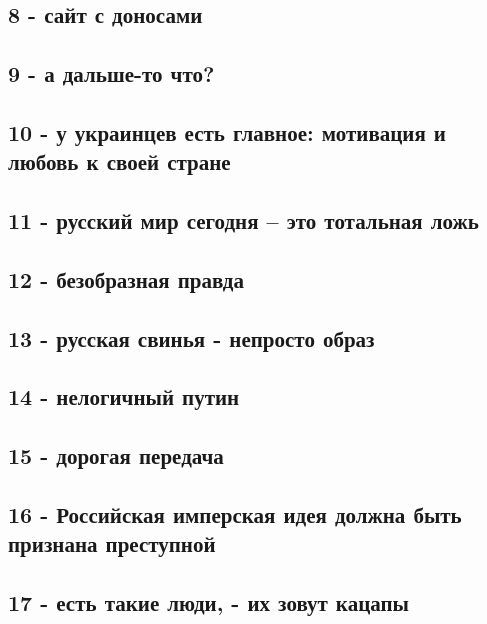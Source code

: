 \subsection{8 - сайт с доносами}

\subsection{9 - а дальше-то что?}

\subsection{10 - у украинцев есть главное: мотивация и любовь к своей стране}

\subsection{11 - русский мир сегодня – это тотальная ложь}

\subsection{12 - безобразная правда}

\subsection{13 - русская свинья - непросто образ}

\subsection{14 - нелогичный путин}

\subsection{15 - дорогая передача}

\subsection{16 - Российская имперская идея должна быть признана преступной}

\subsection{17 - есть такие люди, - их зовут кацапы}

